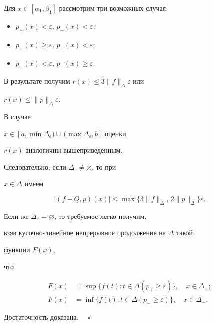 Для $x\in[\alpha_1,\beta_1]$ рассмотрим три возможных случая:


\begin{itemize}


\item[1)] $p_+(x)<\varepsilon$, $p_-(x)<\varepsilon$;


\item[2)] $p_+(x)\ge\varepsilon$, $p_-(x)<\varepsilon$;


\item[3)] $p_+(x)<\varepsilon$, $p_-(x)\ge\varepsilon$.


\end{itemize}


В результате получим $r(x)\le 3\|f\|_\Delta\varepsilon$ или


$r(x)\le\|p\|_\Delta\varepsilon$.





В случае


$x\in[a,\min\Delta_\varepsilon)\cup\,(\max\Delta_\varepsilon,b]$ оценки


$r(x)$ аналогичны вышеприведенным.





Следовательно, если $\Delta_\varepsilon\ne\varnothing$, то при


$x\in\Delta$ имеем


$$


|(f-Q,p)(x)|\le\max\{3\|f\|_\Delta,\,2\|p\|_\Delta\}\varepsilon.


$$


Если же $\Delta_\varepsilon=\varnothing$, то требуемое легко получим,


взяв кусочно-линейное непрерывное продолжение на $\Delta$ такой


функции $F(x)$,


что


\begin{align*}


F(x)&=\sup\{f(t):t\in\Delta(p_+\ge\varepsilon)\},\quad x\in\Delta_+;\\


F(x)&=\inf\{f(t):t\in\Delta(p_-\ge\varepsilon)\},\quad x\in \Delta_-.


\end{align*}


Достаточность доказана. $\quad\square$


\medskip





